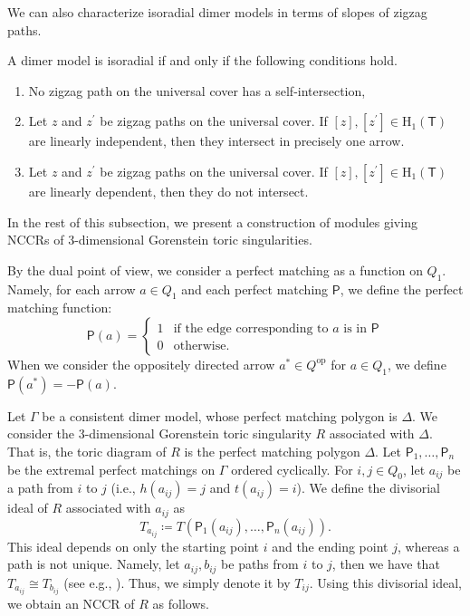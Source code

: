\documentclass[ALCO,ThmDefs,Unicode]{cedram}
\newcommand{\rmH}{\mathrm{H}}
\newcommand{\sfP}{\mathsf{P}}
\newcommand{\sfT}{\mathsf{T}}
\DeclareMathOperator{\op}{op}
\begin{document}
We can also characterize isoradial dimer models in terms of slopes of zigzag paths.

\begin{prop}\label{slope_isoradial}
A dimer model is isoradial if and only if the following conditions hold.
\begin{enumerate}%
\item No zigzag path on the universal cover has a self-intersection,
\item Let $z$ and $z^\prime$ be zigzag paths on the universal cover. If $[z], [z^\prime]\in\rmH_1(\sfT)$ are linearly independent, then they intersect in precisely one arrow.
\item Let $z$ and $z^\prime$ be zigzag paths on the universal cover. If $[z], [z^\prime]\in\rmH_1(\sfT)$ are linearly dependent, then they do not intersect.
\end{enumerate}
\end{prop}


In the rest of this subsection, we present a construction of modules giving NCCRs of $3$-dimensional Gorenstein toric singularities.

By the dual point of view, we consider a perfect matching as a function on $Q_1$. Namely, for each arrow $a\in Q_1$ and each perfect matching $\sfP$, we define the perfect matching function:
\begin{equation}\label{pm_function}
\sfP(a)=%
\begin{cases}
1&\text{if the edge corresponding to $a$ is in $\sfP$}\\
0&\text{otherwise}. %
\end{cases} %
\end{equation}
When we consider the oppositely directed arrow $a^*\in Q^{\op}$ for $a\in Q_1$, we define $\sfP(a^*)=-\sfP(a)$.


Let $\Gamma$ be a consistent dimer model, whose perfect matching polygon is $\Delta$. We consider the $3$-dimensional Gorenstein toric singularity $R$ associated with $\Delta$. That is, the toric diagram of $R$ is the perfect matching polygon $\Delta$. Let $\sfP_1, \ldots, \sfP_n$ be the extremal perfect matchings on $\Gamma$ ordered cyclically. For $i, j\in Q_0$, let $a_{ij}$ be a path from $i$ to $j$ (i.e., $h(a_{ij})=j$ and $t(a_{ij})=i$). We define the divisorial ideal of $R$ associated with $a_{ij}$ as
\[
T_{a_{ij}}\coloneqq T(\sfP_1(a_{ij}), \ldots, \sfP_n(a_{ij})).
\]
This ideal depends on only the starting point $i$ and the ending point $j$, whereas a path is not unique. Namely, let $a_{ij}, b_{ij}$ be paths from $i$ to $j$, then we have that $T_{a_{ij}}\cong T_{b_{ij}}$ (see e.g., \cite[Lemma~3.7]{Nak}). Thus, we simply denote it by $T_{ij}$. Using this divisorial ideal, we obtain an NCCR of $R$ as follows.
\end{document}
